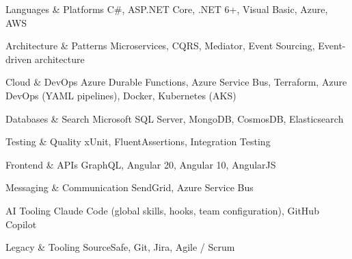 

\begin{cvskills}

  \cvskill
    {Languages \& Platforms} %
    {C\#, ASP.NET Core, .NET 6+, Visual Basic, Azure, AWS} %

  \cvskill
    {Architecture \& Patterns} %
    {Microservices, CQRS, Mediator, Event Sourcing, Event-driven architecture} %

  \cvskill
    {Cloud \& DevOps} %
    {Azure Durable Functions, Azure Service Bus, Terraform, Azure DevOps (YAML pipelines), Docker, Kubernetes (AKS)} %

  \cvskill
    {Databases \& Search} %
    {Microsoft SQL Server, MongoDB, CosmosDB, Elasticsearch} %

  \cvskill
    {Testing \& Quality} %
    {xUnit, FluentAssertions, Integration Testing} %

  \cvskill
    {Frontend \& APIs} %
    {GraphQL, Angular 20, Angular 10, AngularJS} %

  \cvskill
    {Messaging \& Communication} %
    {SendGrid, Azure Service Bus} %

  \cvskill
    {AI Tooling} %
    {Claude Code (global skills, hooks, team configuration), GitHub Copilot} %

  \cvskill
    {Legacy \& Tooling} %
    {SourceSafe, Git, Jira, Agile / Scrum} %

\end{cvskills}
